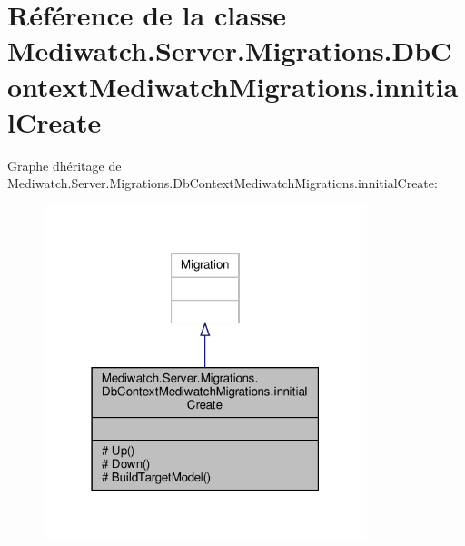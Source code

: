 \hypertarget{class_mediwatch_1_1_server_1_1_migrations_1_1_db_context_mediwatch_migrations_1_1innitial_create}{}\section{Référence de la classe Mediwatch.\+Server.\+Migrations.\+Db\+Context\+Mediwatch\+Migrations.\+innitial\+Create}
\label{class_mediwatch_1_1_server_1_1_migrations_1_1_db_context_mediwatch_migrations_1_1innitial_create}


Graphe d\textquotesingle{}héritage de Mediwatch.\+Server.\+Migrations.\+Db\+Context\+Mediwatch\+Migrations.\+innitial\+Create\+:\nopagebreak
\begin{figure}[H]
\begin{center}
\leavevmode
\includegraphics[width=267pt]{class_mediwatch_1_1_server_1_1_migrations_1_1_db_context_mediwatch_migrations_1_1innitial_create__inherit__graph}
\end{center}
\end{figure}


